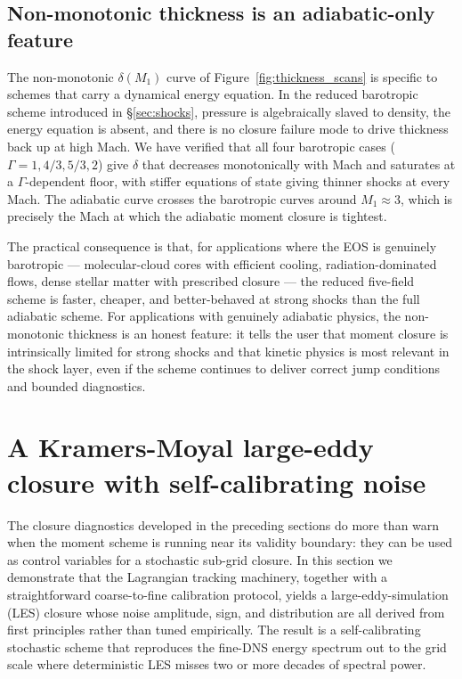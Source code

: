 \documentclass[11pt,letterpaper]{article}
\begin{document}
\subsection{Non-monotonic thickness is an adiabatic-only feature}

The non-monotonic $\delta(M_1)$ curve of Figure~\ref{fig:thickness_scans} is specific to schemes that carry a dynamical energy equation. In the reduced barotropic scheme introduced in \S\ref{sec:shocks}, pressure is algebraically slaved to density, the energy equation is absent, and there is no closure failure mode to drive thickness back up at high Mach. We have verified that all four barotropic cases ($\Gamma = 1, 4/3, 5/3, 2$) give $\delta$ that decreases monotonically with Mach and saturates at a $\Gamma$-dependent floor, with stiffer equations of state giving thinner shocks at every Mach. The adiabatic curve crosses the barotropic curves around $M_1 \approx 3$, which is precisely the Mach at which the adiabatic moment closure is tightest.

The practical consequence is that, for applications where the EOS is genuinely barotropic --- molecular-cloud cores with efficient cooling, radiation-dominated flows, dense stellar matter with prescribed closure --- the reduced five-field scheme is faster, cheaper, and better-behaved at strong shocks than the full adiabatic scheme. For applications with genuinely adiabatic physics, the non-monotonic thickness is an honest feature: it tells the user that moment closure is intrinsically limited for strong shocks and that kinetic physics is most relevant in the shock layer, even if the scheme continues to deliver correct jump conditions and bounded diagnostics.

\section{A Kramers-Moyal large-eddy closure with self-calibrating noise}
\label{sec:kmles}

The closure diagnostics developed in the preceding sections do more than warn when the moment scheme is running near its validity boundary: they can be used as control variables for a stochastic sub-grid closure. In this section we demonstrate that the Lagrangian tracking machinery, together with a straightforward coarse-to-fine calibration protocol, yields a large-eddy-simulation (LES) closure whose noise amplitude, sign, and distribution are all derived from first principles rather than tuned empirically. The result is a self-calibrating stochastic scheme that reproduces the fine-DNS energy spectrum out to the grid scale where deterministic LES misses two or more decades of spectral power.
\end{document}
